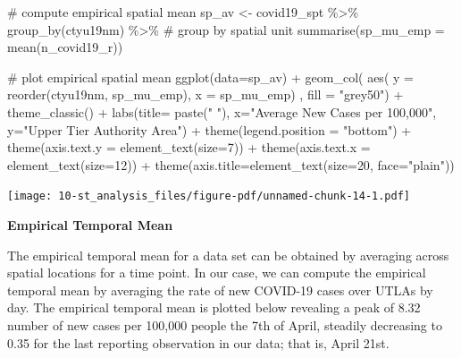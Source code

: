 \documentclass[
  letterpaper,
  DIV=11,
  numbers=noendperiod,
  oneside]{scrreprt}
\newenvironment{Shaded}{\begin{snugshade}}{\end{snugshade}}
\newcommand{\AttributeTok}[1]{\textcolor[rgb]{0.40,0.45,0.13}{#1}}
\newcommand{\CommentTok}[1]{\textcolor[rgb]{0.37,0.37,0.37}{#1}}
\newcommand{\DecValTok}[1]{\textcolor[rgb]{0.68,0.00,0.00}{#1}}
\newcommand{\FunctionTok}[1]{\textcolor[rgb]{0.28,0.35,0.67}{#1}}
\newcommand{\NormalTok}[1]{\textcolor[rgb]{0.00,0.23,0.31}{#1}}
\newcommand{\OtherTok}[1]{\textcolor[rgb]{0.00,0.23,0.31}{#1}}
\newcommand{\SpecialCharTok}[1]{\textcolor[rgb]{0.37,0.37,0.37}{#1}}
\newcommand{\StringTok}[1]{\textcolor[rgb]{0.13,0.47,0.30}{#1}}
\begin{document}
\begin{Shaded}
\begin{Highlighting}[]
\CommentTok{\# compute empirical spatial mean}
\NormalTok{sp\_av }\OtherTok{\textless{}{-}}\NormalTok{ covid19\_spt }\SpecialCharTok{\%\textgreater{}\%} \FunctionTok{group\_by}\NormalTok{(ctyu19nm) }\SpecialCharTok{\%\textgreater{}\%} \CommentTok{\# group by spatial unit}
  \FunctionTok{summarise}\NormalTok{(}\AttributeTok{sp\_mu\_emp =} \FunctionTok{mean}\NormalTok{(n\_covid19\_r))}

\CommentTok{\# plot empirical spatial mean}
\FunctionTok{ggplot}\NormalTok{(}\AttributeTok{data=}\NormalTok{sp\_av) }\SpecialCharTok{+}
  \FunctionTok{geom\_col}\NormalTok{( }\FunctionTok{aes}\NormalTok{( }\AttributeTok{y =} \FunctionTok{reorder}\NormalTok{(ctyu19nm, sp\_mu\_emp), }\AttributeTok{x =}\NormalTok{ sp\_mu\_emp) , }\AttributeTok{fill =} \StringTok{"grey50"}\NormalTok{) }\SpecialCharTok{+}
  \FunctionTok{theme\_classic}\NormalTok{() }\SpecialCharTok{+}
  \FunctionTok{labs}\NormalTok{(}\AttributeTok{title=} \FunctionTok{paste}\NormalTok{(}\StringTok{" "}\NormalTok{), }\AttributeTok{x=}\StringTok{"Average New Cases per 100,000"}\NormalTok{, }\AttributeTok{y=}\StringTok{"Upper Tier Authority Area"}\NormalTok{) }\SpecialCharTok{+}
  \FunctionTok{theme}\NormalTok{(}\AttributeTok{legend.position =} \StringTok{"bottom"}\NormalTok{) }\SpecialCharTok{+}
  \FunctionTok{theme}\NormalTok{(}\AttributeTok{axis.text.y =} \FunctionTok{element\_text}\NormalTok{(}\AttributeTok{size=}\DecValTok{7}\NormalTok{)) }\SpecialCharTok{+}
  \FunctionTok{theme}\NormalTok{(}\AttributeTok{axis.text.x =} \FunctionTok{element\_text}\NormalTok{(}\AttributeTok{size=}\DecValTok{12}\NormalTok{)) }\SpecialCharTok{+}
  \FunctionTok{theme}\NormalTok{(}\AttributeTok{axis.title=}\FunctionTok{element\_text}\NormalTok{(}\AttributeTok{size=}\DecValTok{20}\NormalTok{, }\AttributeTok{face=}\StringTok{"plain"}\NormalTok{))}
\end{Highlighting}
\end{Shaded}

\texttt{[image: 10-st\_analysis\_files/figure-pdf/unnamed-chunk-14-1.pdf]}

\textbf{Empirical Temporal Mean}

The empirical temporal mean for a data set can be obtained by averaging
across spatial locations for a time point. In our case, we can compute
the empirical temporal mean by averaging the rate of new COVID-19 cases
over UTLAs by day. The empirical temporal mean is plotted below
revealing a peak of 8.32 number of new cases per 100,000 people the 7th
of April, steadily decreasing to 0.35 for the last reporting observation
in our data; that is, April 21st.
\end{document}
